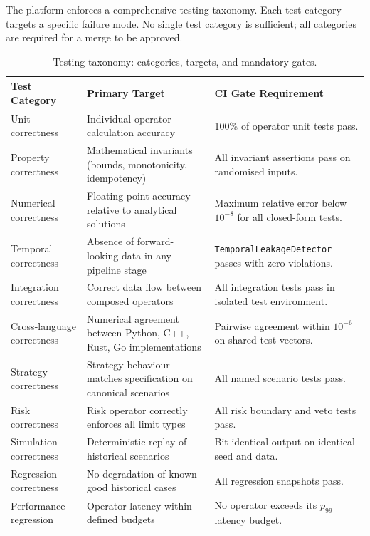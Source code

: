 \documentclass[12pt,openany]{book}
\numberwithin{equation}{chapter}
\theoremstyle{plain}
\theoremstyle{definition}
\theoremstyle{remark}
\begin{document}
The platform enforces a comprehensive testing taxonomy. Each test category
targets a specific failure mode. No single test category is sufficient;
all categories are required for a merge to be approved.

\begin{table}[H]
\centering
\caption{Testing taxonomy: categories, targets, and mandatory gates.}
\label{tab:testing_taxonomy}
\small
\begin{tabularx}{\textwidth}{p{3.8cm} p{5.2cm} p{5.5cm}}
\toprule
\textbf{Test Category} & \textbf{Primary Target} & \textbf{CI Gate Requirement} \\
\midrule
Unit correctness &
    Individual operator calculation accuracy &
    100\% of operator unit tests pass. \\
\midrule
Property correctness &
    Mathematical invariants (bounds, monotonicity, idempotency) &
    All invariant assertions pass on randomised inputs. \\
\midrule
Numerical correctness &
    Floating-point accuracy relative to analytical solutions &
    Maximum relative error below $10^{-8}$ for all closed-form tests. \\
\midrule
Temporal correctness &
    Absence of forward-looking data in any pipeline stage &
    \texttt{TemporalLeakageDetector} passes with zero violations. \\
\midrule
Integration correctness &
    Correct data flow between composed operators &
    All integration tests pass in isolated test environment. \\
\midrule
Cross-language correctness &
    Numerical agreement between Python, C++, Rust, Go implementations &
    Pairwise agreement within $10^{-6}$ on shared test vectors. \\
\midrule
Strategy correctness &
    Strategy behaviour matches specification on canonical scenarios &
    All named scenario tests pass. \\
\midrule
Risk correctness &
    Risk operator correctly enforces all limit types &
    All risk boundary and veto tests pass. \\
\midrule
Simulation correctness &
    Deterministic replay of historical scenarios &
    Bit-identical output on identical seed and data. \\
\midrule
Regression correctness &
    No degradation of known-good historical cases &
    All regression snapshots pass. \\
\midrule
Performance regression &
    Operator latency within defined budgets &
    No operator exceeds its $p_{99}$ latency budget. \\
\bottomrule
\end{tabularx}
\end{table}
\end{document}
